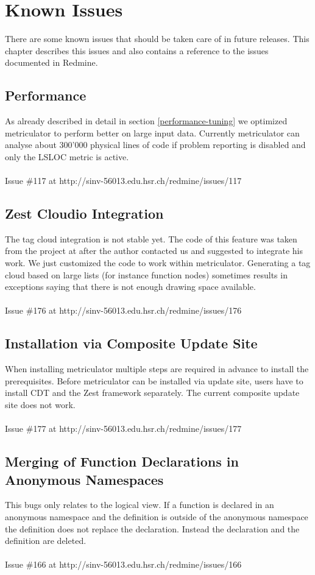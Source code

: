 \documentclass[11pt,a4paper,oneside]{scrreprt}
\begin{document}
\section{Known Issues}\label{knownissues}
There are some known issues that should be taken care of in future releases. This chapter describes this issues and also contains a reference to the issues documented in Redmine.

\subsection{Performance}
As already described in detail in section \ref{performance-tuning} we optimized metriculator to perform better on large input data. Currently metriculator can analyse about 300'000 physical lines of code if problem reporting is disabled and only the LSLOC metric is active. 
\\\\
Issue \#117 at http://sinv-56013.edu.hsr.ch/redmine/issues/117

\subsection{Zest Cloudio Integration}\label{zestcloudio}
The tag cloud integration is not stable yet. The code of this feature was taken from the project at \cite{sourcecloud_git} after the author contacted us and suggested to integrate his work. We just customized the code to work within metriculator. Generating a tag cloud based on large lists (for instance function nodes) sometimes results in exceptions saying that there is not enough drawing space available.
\\\\
Issue \#176 at http://sinv-56013.edu.hsr.ch/redmine/issues/176

\subsection{Installation via Composite Update Site}
When installing metriculator multiple steps are required in advance to install the prerequisites. Before metriculator can be installed via update site, users have to install CDT and the Zest framework separately. The current composite update site does not work.
\\\\
Issue \#177 at http://sinv-56013.edu.hsr.ch/redmine/issues/177

\subsection{Merging of Function Declarations in Anonymous Namespaces}
This bugs only relates to the logical view. If a function is declared in an anonymous namespace and the definition is outside of the anonymous namespace the definition does not replace the declaration. Instead the declaration and the definition are deleted.
\\\\
Issue \#166 at http://sinv-56013.edu.hsr.ch/redmine/issues/166
\end{document}
